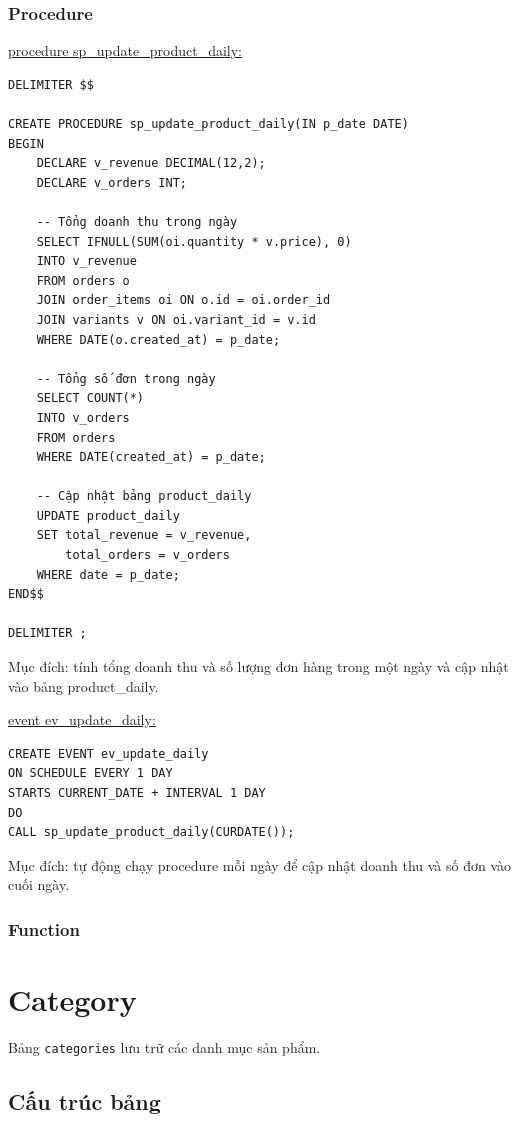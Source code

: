 \subsubsection{Procedure}

\underline{procedure sp\_update\_product\_daily:}

\begin{verbatim}
DELIMITER $$

CREATE PROCEDURE sp_update_product_daily(IN p_date DATE)
BEGIN
    DECLARE v_revenue DECIMAL(12,2);
    DECLARE v_orders INT;

    -- Tổng doanh thu trong ngày
    SELECT IFNULL(SUM(oi.quantity * v.price), 0)
    INTO v_revenue
    FROM orders o
    JOIN order_items oi ON o.id = oi.order_id
    JOIN variants v ON oi.variant_id = v.id
    WHERE DATE(o.created_at) = p_date;

    -- Tổng số đơn trong ngày
    SELECT COUNT(*)
    INTO v_orders
    FROM orders
    WHERE DATE(created_at) = p_date;

    -- Cập nhật bảng product_daily
    UPDATE product_daily
    SET total_revenue = v_revenue,
        total_orders = v_orders
    WHERE date = p_date;
END$$

DELIMITER ;
\end{verbatim}

Mục đích: tính tổng doanh thu và số lượng đơn hàng trong một ngày và cập nhật vào bảng product\_daily.

\underline{event ev\_update\_daily:}

\begin{verbatim}
CREATE EVENT ev_update_daily
ON SCHEDULE EVERY 1 DAY
STARTS CURRENT_DATE + INTERVAL 1 DAY
DO
CALL sp_update_product_daily(CURDATE());
\end{verbatim}

Mục đích: tự động chạy procedure mỗi ngày để cập nhật doanh thu và số đơn vào cuối ngày.

\subsubsection{Function}

\section{Category}

Bảng \texttt{categories} lưu trữ các danh mục sản phẩm.

\subsection{Cấu trúc bảng}

